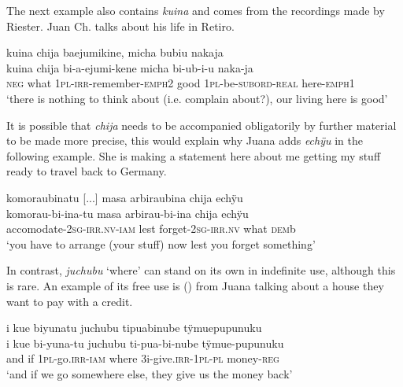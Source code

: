 The next example also contains \textit{kuina} and comes from the recordings made by Riester. Juan Ch. talks about his life in Retiro. 

\ea\label{ex:RCchija2}
\begingl
\glpreamble kuina chija baejumikine, micha bubiu nakaja\\
\gla kuina chija bi-a-ejumi-kene micha bi-ub-i-u naka-ja\\
\glb \textsc{neg} what 1\textsc{pl}-\textsc{irr}-remember-\textsc{emph}2 good 1\textsc{pl}-be-\textsc{subord}-\textsc{real} here-\textsc{emph}1\\
\glft ‘there is nothing to think about (i.e. complain about?), our living here is good’
\endgl
\trailingcitation{[nxx-p630101g-1.175]}
\xe

It is possible that \textit{chija} needs to be accompanied obligatorily by further material to be made more precise, this would explain why Juana adds \textit{echÿu} in the following example. She is making a statement here about me getting my stuff ready to travel back to Germany.

\newpage

\ea\label{ex:chija-INDEF4}
\begingl
\glpreamble komoraubinatu [...] masa arbiraubina chija echÿu\\
\gla komorau-bi-ina-tu masa arbirau-bi-ina chija echÿu\\
\glb accomodate-2\textsc{sg}-\textsc{irr.nv}-\textsc{iam} lest forget-2\textsc{sg}-\textsc{irr.nv} what \textsc{dem}b\\
\glft ‘you have to arrange (your stuff) now lest you forget something’
\endgl
\trailingcitation{[jxx-p120515l-2.276-278]}
\xe


In contrast, \textit{juchubu} ‘where’ can stand on its own in indefinite use, although this is rare. An example of its free use is () from Juana talking about a house they want to pay with a credit.

\ea\label{ex:juchubu-INDEF1}
\begingl
\glpreamble i kue biyunatu juchubu tipuabinube tÿmuepupunuku\\
\gla i kue bi-yuna-tu juchubu ti-pua-bi-nube tÿmue-pupunuku\\
\glb and if 1\textsc{pl}-go.\textsc{irr}-\textsc{iam} where 3i-give.\textsc{irr}-1\textsc{pl}-\textsc{pl} money-\textsc{reg}\\
\glft ‘and if we go somewhere else, they give us the money back’
\endgl
\trailingcitation{[jxx-p120430l-1.388]}
\xe

